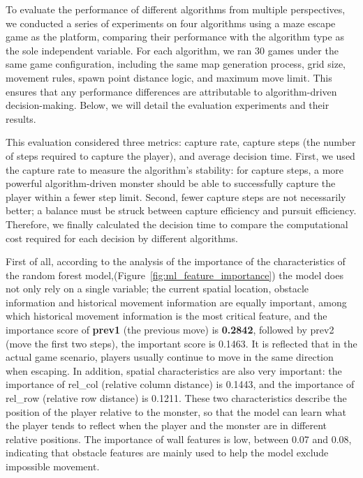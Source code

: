 \documentclass[12pt,a4paper]{article}
\begin{document}
To evaluate the performance of different algorithms from multiple perspectives, we conducted a series of experiments on four algorithms using a maze escape game as the platform, comparing their performance with the algorithm type as the sole independent variable. For each algorithm, we ran 30 games under the same game configuration, including the same map generation process, grid size, movement rules, spawn point distance logic, and maximum move limit. This ensures that any performance differences are attributable to algorithm-driven decision-making. Below, we will detail the evaluation experiments and their results.

This evaluation considered three metrics: capture rate, capture steps (the number of steps required to capture the player), and average decision time. First, we used the capture rate to measure the algorithm's stability: for capture steps, a more powerful algorithm-driven monster should be able to successfully capture the player within a fewer step limit. Second, fewer capture steps are not necessarily better; a balance must be struck between capture efficiency and pursuit efficiency. Therefore, we finally calculated the decision time to compare the computational cost required for each decision by different algorithms.

First of all, according to the analysis of the importance of the characteristics of the random forest model,(Figure~\ref{fig:ml_feature_importance}) the model does not only rely on a single variable; the current spatial location, obstacle information and historical movement information are equally important, among which historical movement information is the most critical feature, and the importance score of \textbf{prev1} (the previous move) is \textbf{0.2842}, followed by prev2 (move the first two steps), the important score is 0.1463. It is reflected that in the actual game scenario, players usually continue to move in the same direction when escaping. In addition, spatial characteristics are also very important: the importance of rel\_col (relative column distance) is 0.1443, and the importance of rel\_row (relative row distance) is 0.1211. These two characteristics describe the position of the player relative to the monster, so that the model can learn what the player tends to reflect when the player and the monster are in different relative positions. The importance of wall features is low, between 0.07 and 0.08, indicating that obstacle features are mainly used to help the model exclude impossible movement.
\end{document}
